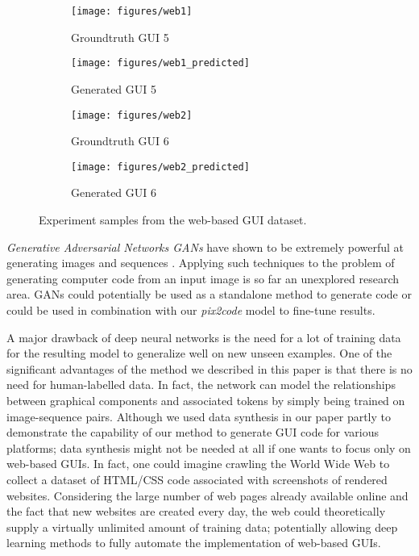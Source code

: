 \documentclass{article}
\begin{document}
\begin{figure}[H]
    \begin{subfigure}{.495\textwidth}
        \centering
        \texttt{[image: figures/web1]}
        \caption{Groundtruth GUI 5}
    \end{subfigure}
    \begin{subfigure}{.495\textwidth}
        \centering
        \texttt{[image: figures/web1\_predicted]}
        \caption{Generated GUI 5}
    \end{subfigure}
    \begin{subfigure}{.495\textwidth}
        \centering
        \texttt{[image: figures/web2]}
        \caption{Groundtruth GUI 6}
    \end{subfigure}
    \begin{subfigure}{.495\textwidth}
        \centering
        \texttt{[image: figures/web2\_predicted]}
        \caption{Generated GUI 6}
    \end{subfigure}
    \caption{Experiment samples from the web-based GUI dataset.}
    \label{fig:samples_web}
\end{figure}

\emph{Generative Adversarial Networks GANs} \cite{goodfellow2014generative} have shown to be extremely powerful at generating images and sequences \cite{yu2016seqgan, reed2016generative, zhang2016stackgan, shetty2017speaking, dai2017towards}. Applying such techniques to the problem of generating computer code from an input image is so far an unexplored research area. GANs could potentially be used as a standalone method to generate code or could be used in combination with our \emph{pix2code} model to fine-tune results.

A major drawback of deep neural networks is the need for a lot of training data for the resulting model to generalize well on new unseen examples. One of the significant advantages of the method we described in this paper is that there is no need for human-labelled data. In fact, the network can model the relationships between graphical components and associated tokens by simply being trained on image-sequence pairs. Although we used data synthesis in our paper partly to demonstrate the capability of our method to generate GUI code for various platforms; data synthesis might not be needed at all if one wants to focus only on web-based GUIs. In fact, one could imagine crawling the World Wide Web to collect a dataset of HTML/CSS code associated with screenshots of rendered websites. Considering the large number of web pages already available online and the fact that new websites are created every day, the web could theoretically supply a virtually unlimited amount of training data; potentially allowing deep learning methods to fully automate the implementation of web-based GUIs.
\end{document}
